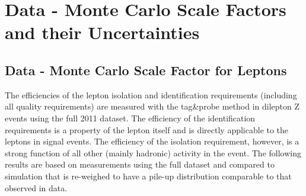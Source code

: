 \section{Data - Monte Carlo Scale Factors and their Uncertainties}
\label{sec:SF}

\subsection{Data - Monte Carlo Scale Factor for Leptons}
\label{sec:tnp}

The efficiencies of the lepton isolation and identification requirements (including all quality requirements) 
are measured with the tag\&probe method in dilepton Z events using the full 2011 dataset.
The efficiency of the identification requirements is a property of the lepton itself and is directly applicable
 to the leptons in signal events.
The efficiency of the isolation requirement, however, is a strong function of all other (mainly hadronic)
activity in the event.
The following results are based on measurements using the full dataset and compared 
to simulation that is re-weighed to have a pile-up distribution comparable to that observed in data.


